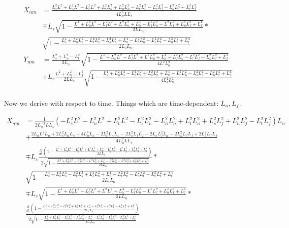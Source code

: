 \documentclass[11pt, landscape]{article}
\begin{document}
\begin{align}
  X_{nm} &= \frac{L_s^2L^2 + L_n^2L^2 - L_t^2L^2 + L_s^2L_{n}^2 + L_n^2L_{n}^2 - L_t^2L_{n}^2 - L_s^2L_{f}^2 - L_n^2L_{f}^2 + L_t^2L_{f}^2}{4L_n^2LL_s}\\
  &\mp L_s\sqrt{1-\frac{L^4 + L_n^2L^2 - L_f^2L^2 + L^2L_{n}^2 + L_{n}^4 - L_f^2L_{n}^2 - L^2L_{f}^2 + L_n^2L_{f}^2 + L_{f}^4}{2LL_{n}}}*\\
  &\sqrt{1-\frac{L_{s}^4 + L_n^2L_{s}^2 - L_t^2L_{s}^2 + L_s^2L_{n}^2 + L_{n}^4 - L_t^2L_{n}^2 - L_s^2L_{t}^2 - L_n^2L_{t}^2 + L_{t}^4}{2L_{s}L_{n}}}\\
  Y_{nm} &= \frac{L_{s}^2+L_{n}^2-L_{t}^2}{2L_{n}} \sqrt{1-\frac{L^4 + L_n^2L^2 - L_f^2L^2 + L^2L_{n}^2 + L_{n}^4 - L_f^2L_{n}^2 - L^2L_{f}^2 - L_n^2L_{f}^2 + L_{f}^4}{4L^2L^2_{n}}}\\ &\pm L_s\frac{L^2+L_{n}^2-L_{f}^2}{2LL_{n}}\sqrt{1 - \frac{L_{s}^4 + L_n^2L_{s}^2 - L_t^2L_{s}^2 + L_s^2L_{n}^2 + L_{n}^4 - L_t^2L_{n}^2 - L_s^2L_{t}^2 - L_n^2L_{t}^2 + L_{t}^4}{4L^2_{s}L^2_{n}}}\\
\end{align}

Now we derive with respect to time. Things which are time-dependent: $L_n, L_f$.

\begin{align}
  \dot{X}_{nm} &= \frac{1}{{2L_n^{-3}LL_s}}\left(-L_s^2L^2 - L_n^2L^2 + L_t^2L^2 - L_s^2L_{n}^2 - L_n^2L_{n}^2 + L_t^2L_{n}^2 + L_s^2L_{f}^2 + L_n^2L_{f}^2 - L_t^2L_{f}^2\right)\dot{L}_n\\ &+ \frac{2L_nL^2\dot{L}_n + 2L_s^2L_{n}\dot{L}_n + 4L_n^3\dot{L}_n - 2L_t^2L_{n}\dot{L}_n - 2L_s^2L_{f}\dot{L}_f - 2L_nL_{f}^2\dot{L}_n - 2L_n^2L_{f}\dot{L}_f + 2L_t^2L_{f}\dot{L}_f}{4L_n^2LL_s}\\
  &\mp L_s\frac{\frac{d}{dt}\left(1-\frac{L^4 + L_n^2L^2 - L_f^2L^2 + L^2L_{n}^2 + L_{n}^4 - L_f^2L_{n}^2 - L^2L_{f}^2 + L_n^2L_{f}^2 + L_{f}^4}{2LL_{n}}\right)}{2\sqrt{1-\frac{L^4 + L_n^2L^2 - L_f^2L^2 + L^2L_{n}^2 + L_{n}^4 - L_f^2L_{n}^2 - L^2L_{f}^2 + L_n^2L_{f}^2 + L_{f}^4}{2LL_{n}}}}*\\
  &\sqrt{1-\frac{L_{s}^4 + L_n^2L_{s}^2 - L_t^2L_{s}^2 + L_s^2L_{n}^2 + L_{n}^4 - L_t^2L_{n}^2 - L_s^2L_{t}^2 - L_n^2L_{t}^2 + L_{t}^4}{2L_{s}L_{n}}}\\
  &\mp L_s\sqrt{1-\frac{L^4 + L_n^2L^2 - L_f^2L^2 + L^2L_{n}^2 + L_{n}^4 - L_f^2L_{n}^2 - L^2L_{f}^2 + L_n^2L_{f}^2 + L_{f}^4}{2LL_{n}}}*\\
  &\frac{\frac{d}{dt}\left(1-\frac{L_{s}^4 + L_n^2L_{s}^2 - L_t^2L_{s}^2 + L_s^2L_{n}^2 + L_{n}^4 - L_t^2L_{n}^2 - L_s^2L_{t}^2 - L_n^2L_{t}^2 + L_{t}^4}{2L_{s}L_{n}}\right)}{2\sqrt{1-\frac{L_{s}^4 + L_n^2L_{s}^2 - L_t^2L_{s}^2 + L_s^2L_{n}^2 + L_{n}^4 - L_t^2L_{n}^2 - L_s^2L_{t}^2 - L_n^2L_{t}^2 + L_{t}^4}{2L_{s}L_{n}}}}\\
\end{align}
\end{document}
